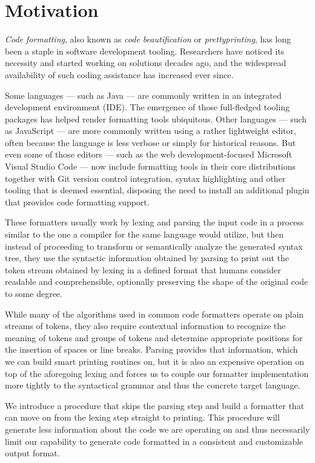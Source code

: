 \chapter{Motivation}
\textit{Code formatting}, also known as \textit{code beautification} or \textit{prettyprinting},
has long been a staple in software development tooling.
Researchers have noticed its necessity and started working on solutions decades ago,
\autocite{syntaxDirectedPrettyprinting}
and the widespread availability of such coding assistance has increased ever since.

Some languages --- such as Java --- are commonly written in an integrated development environment (IDE).
The emergence of those full-fledged tooling packages has helped render formatting tools ubiquitous.
Other languages --- such as JavaScript --- are more commonly written using a rather lightweight editor,
often because the language is less verbose or simply for historical reasons.
But even some of those editors --- such as the web development-focused Microsoft Visual Studio Code ---
now include formatting tools in their core distributions together with
Git version control integration, syntax highlighting and other tooling that is deemed essential,
disposing the need to install an additional plugin that provides code formatting support.
\autocite{vsCodeJavascriptDoc}

These formatters usually work by lexing and parsing the input code
in a process similar to the one a compiler for the same language would utilize,
but then instead of proceeding to transform or semantically analyze the generated syntax tree,
they use the syntactic information obtained by parsing
to print out the token stream obtained by lexing
in a defined format that humans consider readable and comprehensible,
optionally preserving the shape of the original code to some degree.
\autocite{prettyGoodFormattingPipeline}

While many of the algorithms used in common code formatters
operate on plain streams of tokens, \autocite{prettyprinting}
they also require contextual information
to recognize the meaning of tokens and groups of tokens
and determine appropriate positions for the insertion of spaces or line breaks.
Parsing provides that information, which we can build smart printing routines on,
but it is also an expensive operation on top of the aforegoing lexing
and forces us to couple our formatter implementation more tightly
to the syntactical grammar and thus the concrete target language.

We introduce a procedure that skips the parsing step and
build a formatter that can move on from the lexing step straight to printing.
This procedure will generate less information about the code we are operating on and
thus necessarily limit our capability to generate code
formatted in a consistent and customizable output format.

